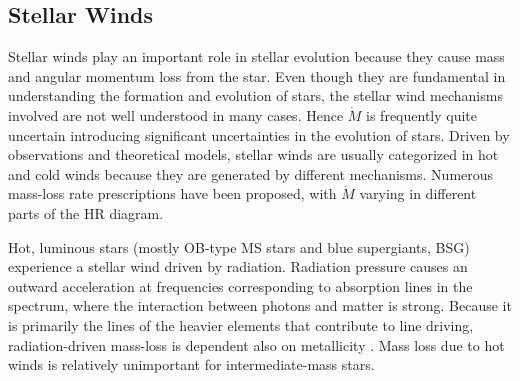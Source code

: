 \subsection{Stellar Winds}\label{sub:winds}

Stellar winds play an important role in stellar evolution because they cause mass and angular momentum loss from the star. Even though they are fundamental in understanding the formation and evolution of stars, the stellar wind mechanisms involved are not well understood in many cases. Hence $\dot{M}$ is frequently quite uncertain introducing significant uncertainties in the evolution of stars. Driven by observations and theoretical models, stellar winds are usually categorized in hot and cold winds because they are generated by different mechanisms. Numerous mass-loss rate prescriptions have been proposed, with $\dot{M}$ varying in different parts of the HR diagram.

Hot, luminous stars (mostly OB-type MS stars and blue supergiants, BSG) experience a stellar wind driven by radiation. Radiation pressure causes an outward acceleration at frequencies corresponding to absorption lines in the spectrum, where the interaction between photons and matter is strong. Because it is primarily the lines of the heavier elements that contribute to line driving, radiation-driven mass-loss is dependent also on metallicity \citep{vink2001mass}. Mass loss due to hot winds is relatively unimportant for intermediate-mass stars.

